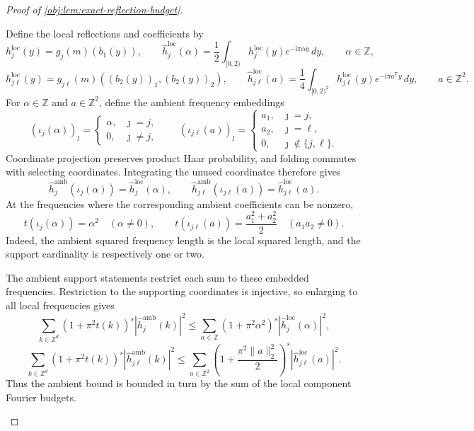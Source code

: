 \begin{proof}[Proof of \cref{obj:lem:exact-reflection-budget}]
\begin{enumerate}
Define the local reflections and coefficients by
\[
h_j^{\mathrm{loc}}(y)
=
g_j(m)(b_1(y)),
\qquad
\widehat h_j^{\mathrm{loc}}(\alpha)
=
\frac12\int_{[0,2)}
h_j^{\mathrm{loc}}(y)e^{-\mathrm i\pi\alpha y}\,dy,
\qquad \alpha\in\mathbb Z,
\]
\[
h_{j\ell}^{\mathrm{loc}}(y)
=
g_{j\ell}(m)((b_2(y))_1,(b_2(y))_2),
\qquad
\widehat h_{j\ell}^{\mathrm{loc}}(a)
=
\frac14\int_{[0,2)^2}
h_{j\ell}^{\mathrm{loc}}(y)e^{-\mathrm i\pi a^{\mathsf T}y}\,dy,
\qquad a\in\mathbb Z^2.
\]
For \(\alpha\in\mathbb Z\) and \(a\in\mathbb Z^2\), define the ambient frequency embeddings
\[
(\iota_j(\alpha))_\jmath
=
\begin{cases}
\alpha,&\jmath=j,\\
0,&\jmath\neq j,
\end{cases}
\qquad
(\iota_{j\ell}(a))_\jmath
=
\begin{cases}
a_1,&\jmath=j,\\
a_2,&\jmath=\ell,\\
0,&\jmath\notin\{j,\ell\}.
\end{cases}
\]
Coordinate projection preserves product Haar probability, and folding commutes with selecting coordinates. Integrating the unused coordinates therefore gives
\[
\widehat h_j^{\mathrm{amb}}(\iota_j(\alpha))
=
\widehat h_j^{\mathrm{loc}}(\alpha),
\qquad
\widehat h_{j\ell}^{\mathrm{amb}}(\iota_{j\ell}(a))
=
\widehat h_{j\ell}^{\mathrm{loc}}(a).
\]
At the frequencies where the corresponding ambient coefficients can be nonzero,
\[
t(\iota_j(\alpha))=\alpha^2
\quad(\alpha\neq0),
\qquad
t(\iota_{j\ell}(a))=\frac{a_1^2+a_2^2}{2}
\quad(a_1a_2\neq0).
\]
Indeed, the ambient squared frequency length is the local squared length, and the support cardinality is respectively one or two.

The ambient support statements restrict each sum to these embedded frequencies. Restriction to the supporting coordinates is injective, so enlarging to all local frequencies gives
\[
\sum_{k\in\mathbb Z^d}
(1+\pi^2t(k))^s|\widehat h_j^{\mathrm{amb}}(k)|^2
\leq
\sum_{\alpha\in\mathbb Z}
(1+\pi^2\alpha^2)^s|\widehat h_j^{\mathrm{loc}}(\alpha)|^2,
\]
\[
\sum_{k\in\mathbb Z^d}
(1+\pi^2t(k))^s|\widehat h_{j\ell}^{\mathrm{amb}}(k)|^2
\leq
\sum_{a\in\mathbb Z^2}
\left(1+\frac{\pi^2\|a\|_2^2}{2}\right)^s
|\widehat h_{j\ell}^{\mathrm{loc}}(a)|^2.
\]
Thus the ambient bound is bounded in turn by the sum of the local component Fourier budgets.


\end{enumerate}
\end{proof}
